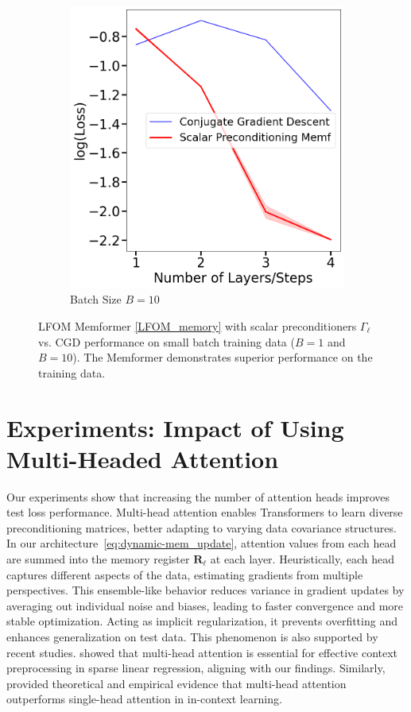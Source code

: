 \documentclass[11pt]{article}
\numberwithin{equation}{section}
\begin{document}
\begin{figure}
\begin{subfigure}[b]{0.45\textwidth}
    \includegraphics[width=\textwidth]{Batch_Size_10.png}
    \caption{Batch Size \( B = 10 \)}
    \label{fig:batch_size_10}
  \end{subfigure}
  \caption{LFOM Memformer \eqref{LFOM_memory} with scalar preconditioners \(\Gamma_\ell\) vs. CGD performance on small batch training data (\( B = 1 \) and \( B = 10 \)). The Memformer demonstrates superior performance on the training data.}
  \label{fig:small-batches-experiment}
\end{figure}

\section{Experiments: Impact of Using Multi-Headed Attention}
\label{Section:Multi-Headed_Attention}
Our experiments show that increasing the number of attention heads improves test loss performance. Multi-head attention enables Transformers to learn diverse preconditioning matrices, better adapting to varying data covariance structures. In our architecture~\eqref{eq:dynamic-mem_update}, attention values from each head are summed into the memory register \( \mathbf{R}_\ell \) at each layer. Heuristically, each head captures different aspects of the data, estimating gradients from multiple perspectives. This ensemble-like behavior reduces variance in gradient updates by averaging out individual noise and biases, leading to faster convergence and more stable optimization. Acting as implicit regularization, it prevents overfitting and enhances generalization on test data. This phenomenon is also supported by recent studies. \citet{chen2024transformers} showed that multi-head attention is essential for effective context preprocessing in sparse linear regression, aligning with our findings. Similarly, \citet{cui2024superiority} provided theoretical and empirical evidence that multi-head attention outperforms single-head attention in in-context learning.
\end{document}
